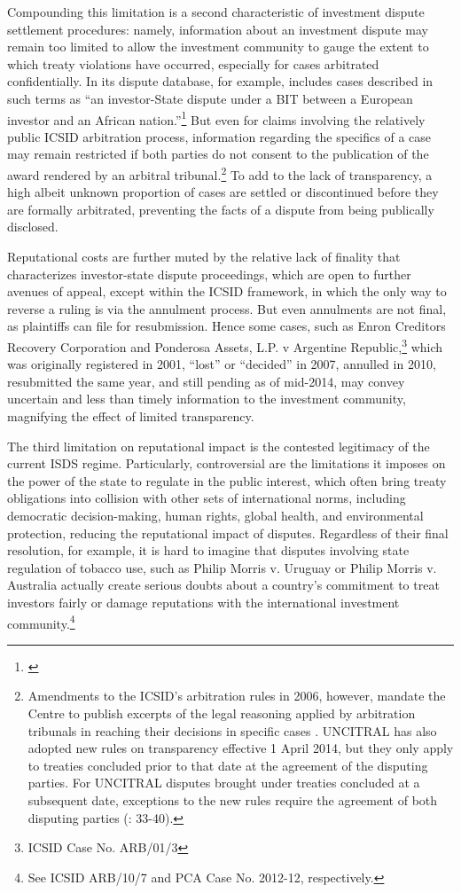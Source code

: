 \documentclass[12pt,onesided]{amsart}
\begin{document}
Compounding this limitation is a second characteristic of investment dispute settlement procedures: namely, information about an investment dispute may remain too limited to allow the investment community to gauge the extent to which treaty violations have occurred, especially for cases arbitrated confidentially. In its dispute database, for example, \citeauthor{unctad:2010} includes cases described in such terms as ``an investor-State dispute under a BIT between a European investor and an African nation.''\footnote{\citet{unctad:2010}} But even for claims involving the relatively public ICSID arbitration process, information regarding the specifics of a case may remain restricted if both parties do not consent to the publication of the award rendered by an arbitral tribunal.\footnote{Amendments to the ICSID's arbitration rules in 2006, however, mandate the Centre to publish excerpts of the legal reasoning applied by arbitration tribunals in reaching their decisions in specific cases \citep{antonietti:2006}. UNCITRAL has also adopted new rules on transparency effective 1 April 2014, but they only apply to treaties concluded prior to that date at the agreement of the disputing parties. For UNCITRAL disputes brought under treaties concluded at a subsequent date, exceptions to the new rules require the agreement of both disputing parties (\citealp{uncitral:2013}: 33-40).}  To add to the lack of transparency, a high albeit unknown proportion of cases are settled or discontinued before they are formally arbitrated, preventing the facts of a dispute from being publically disclosed. 

Reputational costs are further muted by the relative lack of finality that characterizes investor-state dispute proceedings, which are open to further avenues of appeal, except within the ICSID framework, in which the only way to reverse a ruling is via the annulment process. But even annulments are not final, as plaintiffs can file for resubmission. Hence some cases, such as Enron Creditors Recovery Corporation and Ponderosa Assets, L.P. v Argentine Republic,\footnote{ICSID Case No. ARB/01/3} which was originally registered in 2001, ``lost'' or ``decided'' in 2007, annulled in 2010, resubmitted the same year, and still pending as of mid-2014, may convey uncertain and less than timely information to the investment community, magnifying the effect of limited transparency. 

The third limitation on reputational impact is the contested legitimacy of the current ISDS regime. Particularly, controversial are the limitations it imposes on the power of the state to regulate in the public interest, which often bring treaty obligations into collision with other sets of international norms, including democratic decision-making, human rights, global health, and environmental protection, reducing the reputational impact of disputes. Regardless of their final resolution, for example, it is hard to imagine that disputes involving state regulation of tobacco use, such as Philip Morris v. Uruguay or Philip Morris v. Australia actually create serious doubts about a country's commitment to treat investors fairly or damage reputations with the international investment community.\footnote{See ICSID ARB/10/7 and PCA Case No. 2012-12, respectively.} 
\end{document}
